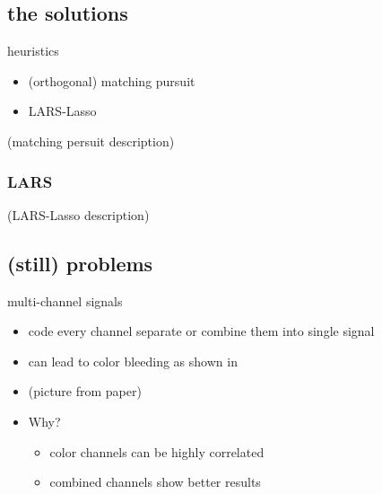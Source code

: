 \subsection{the solutions}
\begin{frame}
heuristics
\begin{itemize}
\item (orthogonal) matching pursuit
\item LARS-Lasso \cite{Osborne2000New}
\end{itemize}
\end{frame}


\begin{frame}
(matching persuit description)
\end{frame}

\subsubsection*{LARS}
\begin{frame}
(LARS-Lasso description)
\end{frame}



\subsection{(still) problems}
\begin{frame}
multi-channel signals
\begin{itemize}
\item code every channel separate or combine them into single signal
\pause
\item  can lead to color bleeding as shown in \cite{mairal08sparse} %
\item (picture from paper)
\pause
\item Why?
	\begin{itemize}
	\item color channels can be highly correlated 
	\item combined channels show better results
	\end{itemize}
\end{itemize}
\end{frame}


